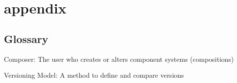 \chapter{appendix}

\section{Glossary}
Composer: The user who creates or alters component systems (compositions)

Versioning Model: A method to define and compare versions
